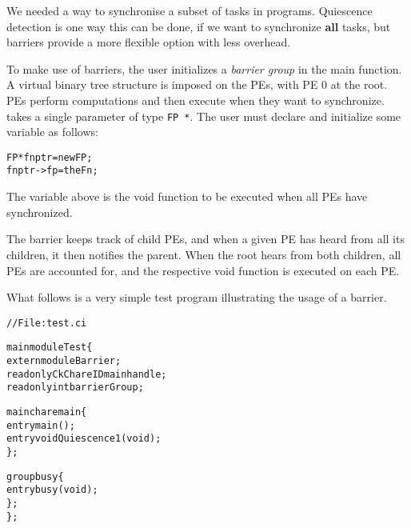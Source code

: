 We needed a way to synchronise a subset of tasks in \charmpp{}
programs. Quiescence detection is one way this can be done, if we want
to synchronize {\bf all} tasks, but barriers provide a more flexible
option with less overhead. 

To make use of barriers, the user initializes a {\em barrier group} in
the main function. A virtual binary tree structure is imposed on the
PEs, with PE 0 at the root.  PEs perform computations and then execute
 when they want to synchronize.   takes
a single parameter of type {\tt FP *}.  The user must declare and
initialize some variable  as follows:

\begin{alltt}
  FP *fnptr = new FP;
  fnptr->fp = theFn;
\end{alltt}

The variable  above is the void function to be executed when all
PEs have synchronized.

The barrier keeps track of child PEs, and when a given PE has heard
from all its children, it then notifies the parent.  When the root
hears from both children, all PEs are accounted for, and the
respective void function is executed on each PE. 

What follows is a very simple test program illustrating the usage of a
barrier.

\begin{alltt}
// File: test.ci

mainmodule Test \{
  extern module Barrier;
  readonly CkChareID mainhandle;
  readonly int barrierGroup;
  
  mainchare main \{
    entry main();
    entry void Quiescence1(void);
  \};
  
  group busy \{
    entry busy(void);
  \};
\};
\end{alltt}

